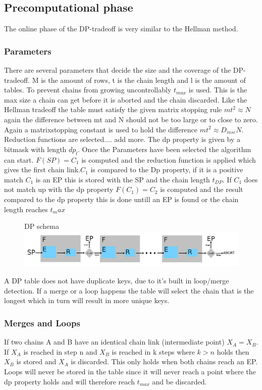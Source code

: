 \subsection{Precomputational phase}
The online phase of the DP-tradeoff is very similar to the Hellman method.
\subsubsection{Parameters}
There are several parameters that decide the size and the coverage of
the DP-tradeoff. M is the amount of rows, t is the chain length  and l is the amount of tables.
To prevent chains from growing uncontrollably $t_{max}$ is used. This is the max size a chain can get before it is aborted and the chain discarded.
Like the Hellman tradeoff the table must satisfy the
given matrix stopping rule $mt^2\approx N$ again the difference between
mt and N should not be too large or to close to zero. Again a
matrixstopping constant is used to hold the difference $mt^2\approx
D_{msc}N$. Reduction functions are selected.... add more. The dp property is given by a bitmask with length $dp_l$.
Once the Parameters have been selected the algorithm can start. $F(SP)=C_1$ is computed and the reduction function is applied which gives the first chain link.$C_1$ is compared to the Dp property, if it is a positive match $C_1$ is an EP this is stored with the SP and the chain length $t_{DP}$. If $C_1$ does not match up with the dp property $F(C_1)=C_2$ is computed and the result compared to the dp property this is done untill an EP is found or the chain length reaches $t_max$


\begin{figure}[th]
  DP schema
  \includegraphics[width=\textwidth]{figures/DPSchema.png}
  \centering
\end{figure}

A DP table does not have duplicate keys, due to it's built in loop/merge detection. If a merge or a loop happens the table will select the chain that is the longest which in turn will result in more unique keys.
\subsubsection{Merges and Loops}
If two chains A and B have an identical chain link (intermediate point) $X_A = X_B$. If $X_A$ is reached in step n and $X_B$ is reached in k steps where $k>n$ holds then $X_B$ is stored and $X_A$ is discarded. This only holds when both chains reach an EP. Loops will never be stored in the table since it will never reach a point where the dp property holds and will therefore reach $t_{max}$ and be discarded.

